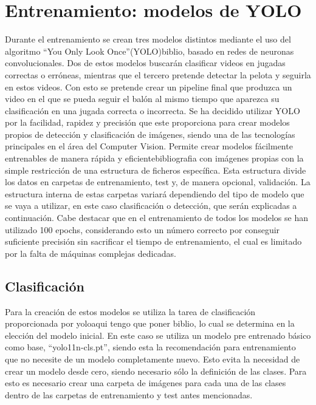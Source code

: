 \documentclass[12pt]{report} %
\begin{document}
    \section{Entrenamiento: modelos de YOLO}

    Durante el entrenamiento se crean tres modelos distintos mediante el uso del algoritmo “You Only Look Once”(YOLO){biblio}, basado en redes de neuronas convolucionales. Dos de estos modelos buscarán clasificar videos en jugadas correctas o erróneas, mientras que el tercero pretende detectar la pelota y seguirla en estos videos. Con esto se pretende crear un pipeline final que produzca un video en el que se pueda seguir el balón al mismo tiempo que aparezca su clasificación en una jugada correcta o incorrecta. 
    Se ha decidido utilizar YOLO por la facilidad, rapidez y precisión que este proporciona para crear modelos propios de detección y clasificación de imágenes, siendo una de las tecnologías principales en el área del Computer Vision. Permite crear modelos fácilmente entrenables de manera rápida y eficiente{bibliografia} con imágenes propias con la simple restricción de una estructura de ficheros específica. Esta estructura divide los datos en carpetas de entrenamiento, test y, de manera opcional, validación. La estructura interna de estas carpetas variará dependiendo del tipo de modelo que se vaya a utilizar, en este caso clasificación o detección, que serán explicadas a continuación. 
    Cabe destacar que en el entrenamiento de todos los modelos se han utilizado 100 epochs, considerando esto un número correcto por conseguir suficiente precisión sin sacrificar el tiempo de entrenamiento, el cual es limitado por la falta de máquinas complejas dedicadas.
    
    \subsection{Clasificación}
    Para la creación de estos modelos se utiliza la tarea de clasificación proporcionada por yolo{aqui tengo que poner biblio}, lo cual se determina en la elección del modelo inicial. En este caso se utiliza un modelo pre entrenado básico como base, “yolo11n-cls.pt”, siendo esta la recomendación para entrenamiento que no necesite de un modelo completamente nuevo. Esto evita la necesidad de crear un modelo desde cero, siendo necesario sólo la definición de las clases. Para  esto es necesario crear una carpeta de imágenes para cada una de las clases dentro de las carpetas de entrenamiento y test antes mencionadas. 
    
\end{document}
